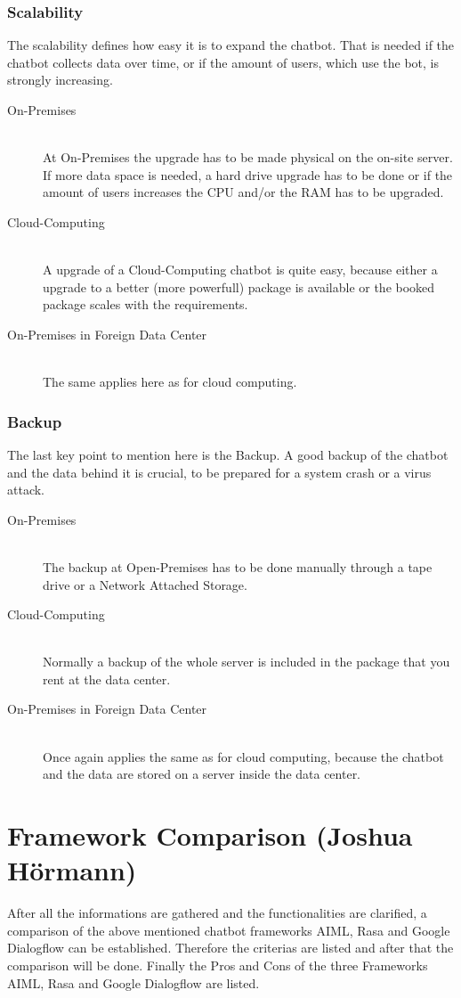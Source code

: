 \documentclass[10pt,final,journal,a4paper,oneside,twocolumn]{IEEEtran}
\begin{document}
\subsubsection{Scalability}
The scalability defines how easy it is to expand the chatbot. That is needed if the chatbot collects data over time, or if the amount of users, which use the bot, is strongly increasing.
\begin{description}
\item[On-Premises]\hfill \\
At On-Premises the upgrade has to be made physical on the on-site server. \cite{b29} If more data space is needed, a hard drive upgrade has to be done or if the amount of users increases the CPU and/or the RAM has to be upgraded.
\item[Cloud-Computing]\hfill \\ 
A upgrade of a Cloud-Computing chatbot is quite easy, because either a upgrade to a better (more powerfull) package is available or the booked package scales with the requirements.
\item[On-Premises in Foreign Data Center]\hfill \\
The same applies here as for cloud computing.
\end{description}

\subsubsection{Backup}
The last key point to mention here is the Backup. A good backup of the chatbot and the data behind it is crucial, to be prepared for a system crash or a virus attack.
\begin{description}
\item[On-Premises]\hfill \\
The backup at Open-Premises has to be done manually through a tape drive or a Network Attached Storage.
\item[Cloud-Computing]\hfill \\ 
Normally a backup of the whole server is included in the package that you rent at the data center.
\item[On-Premises in Foreign Data Center]\hfill \\
Once again applies the same as for cloud computing, because the chatbot and the data are stored on a server inside the data center.
\end{description}


\section{Framework Comparison (Joshua Hörmann)}\label{sec:comparison}
After all the informations are gathered and the functionalities are clarified, a comparison of the above mentioned chatbot frameworks AIML, Rasa and Google Dialogflow can be established. Therefore the criterias are listed and after that the comparison will be done. Finally the Pros and Cons of the three Frameworks AIML, Rasa and Google Dialogflow are listed.
\end{document}
